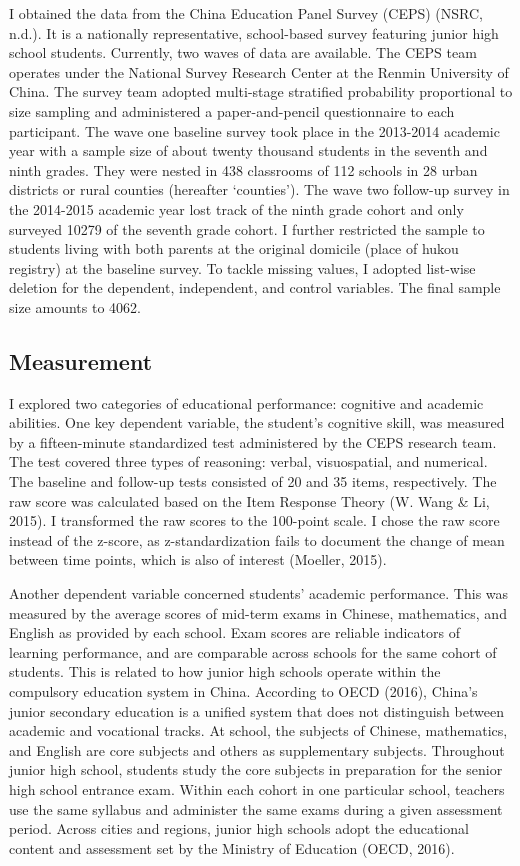 \documentclass[
  man,floatsintext]{apa7}
\begin{document}
I obtained the data from the China Education Panel Survey (CEPS) (NSRC, n.d.). It is a nationally representative, school-based survey featuring junior high school students. Currently, two waves of data are available. The CEPS team operates under the National Survey Research Center at the Renmin University of China. The survey team adopted multi-stage stratified probability proportional to size sampling and administered a paper-and-pencil questionnaire to each participant. The wave one baseline survey took place in the 2013-2014 academic year with a sample size of about twenty thousand students in the seventh and ninth grades. They were nested in 438 classrooms of 112 schools in 28 urban districts or rural counties (hereafter `counties'). The wave two follow-up survey in the 2014-2015 academic year lost track of the ninth grade cohort and only surveyed 10279 of the seventh grade cohort. I further restricted the sample to students living with both parents at the original domicile (place of hukou registry) at the baseline survey. To tackle missing values, I adopted list-wise deletion for the dependent, independent, and control variables. The final sample size amounts to 4062.

\hypertarget{measurement}{%
\subsection{Measurement}\label{measurement}}

I explored two categories of educational performance: cognitive and academic abilities. One key dependent variable, the student's cognitive skill, was measured by a fifteen-minute standardized test administered by the CEPS research team. The test covered three types of reasoning: verbal, visuospatial, and numerical. The baseline and follow-up tests consisted of 20 and 35 items, respectively. The raw score was calculated based on the Item Response Theory (W. Wang \& Li, 2015). I transformed the raw scores to the 100-point scale. I chose the raw score instead of the z-score, as z-standardization fails to document the change of mean between time points, which is also of interest (Moeller, 2015).

Another dependent variable concerned students' academic performance. This was measured by the average scores of mid-term exams in Chinese, mathematics, and English as provided by each school. Exam scores are reliable indicators of learning performance, and are comparable across schools for the same cohort of students. This is related to how junior high schools operate within the compulsory education system in China. According to OECD (2016), China's junior secondary education is a unified system that does not distinguish between academic and vocational tracks. At school, the subjects of Chinese, mathematics, and English are core subjects and others as supplementary subjects. Throughout junior high school, students study the core subjects in preparation for the senior high school entrance exam. Within each cohort in one particular school, teachers use the same syllabus and administer the same exams during a given assessment period. Across cities and regions, junior high schools adopt the educational content and assessment set by the Ministry of Education (OECD, 2016).
\end{document}
